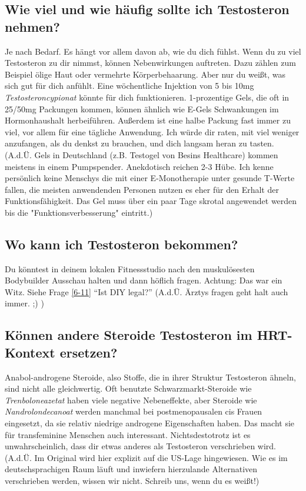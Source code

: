 \documentclass{article}
\begin{document}
\subsection{Wie viel und wie häufig sollte ich Testosteron nehmen?}

Je nach Bedarf. Es hängt vor allem davon ab, wie du dich fühlst. Wenn du zu viel Testosteron zu dir nimmst, können Nebenwirkungen auftreten. Dazu zählen zum Beispiel ölige Haut oder vermehrte Körperbehaarung. Aber nur du weißt, was sich gut für dich anfühlt. Eine wöchentliche Injektion von 5 bis 10mg \textit{Testosteroncypionat} könnte für dich funktionieren.  1-prozentige Gels, die oft in 25/50mg Packungen kommen, können ähnlich wie E-Gels Schwankungen im Hormonhaushalt herbeiführen. Außerdem ist eine halbe Packung fast immer zu viel, vor allem für eine tägliche Anwendung. Ich würde dir raten, mit viel weniger anzufangen, als du denkst zu brauchen, und dich langsam heran zu tasten. (A.d.Ü. Gels in Deutschland (z.B. Testogel von Besins Healthcare) kommen meistens in einem Pumpspender. Anekdotisch reichen 2-3 Hübe. Ich kenne persönlich keine Menschys die mit einer E-Monotherapie unter gesunde T-Werte fallen, die meisten anwendenden Personen nutzen es eher für den Erhalt der Funktionsfähigkeit. Das Gel muss über ein paar Tage skrotal angewendet werden bis die "Funktionsverbesserung" eintritt.)

\subsection{Wo kann ich Testosteron bekommen?}

Du könntest in deinem lokalen Fitnessstudio nach den muskulösesten Bodybuilder Ausschau halten und dann höflich fragen. Achtung: Das war ein Witz. Siehe Frage \ref{6-11} “Ist DIY legal?” (A.d.Ü. Ärztys fragen geht halt auch immer. ;) )

\subsection{Können andere Steroide Testosteron im HRT-Kontext ersetzen?}

Anabol-androgene Steroide, also Stoffe, die in ihrer Struktur Testosteron ähneln, sind nicht alle gleichwertig. Oft benutzte Schwarzmarkt-Steroide wie \textit{Trenboloneazetat} haben viele negative Nebeneffekte, aber Steroide wie \textit{Nandrolondecanoat }werden manchmal bei postmenopausalen cis Frauen eingesetzt, da sie relativ niedrige androgene Eigenschaften haben. Das macht sie für transfeminine Menschen auch interessant. Nichtsdestotrotz ist es unwahrscheinlich, dass dir etwas anderes als Testosteron verschrieben wird. (A.d.Ü. Im Original wird hier explizit auf die US-Lage hingewiesen. Wie es im deutschsprachigen Raum läuft und inwiefern hierzulande Alternativen verschrieben werden, wissen wir nicht. Schreib uns, wenn du es weißt!)
\end{document}
